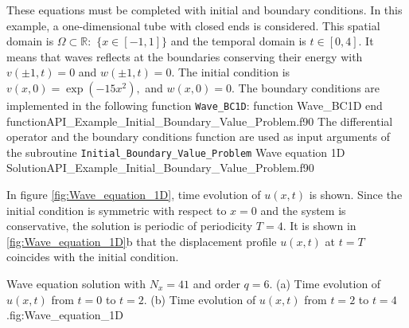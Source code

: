 These equations must be completed with initial and boundary conditions. In this example,  a one-dimensional tube
with closed ends is considered. This spatial domain is $\Omega \subset \mathbb{R} : $ $\{x\in  [-1,1]\}$ and the temporal domain is $t \in [0,4]$.  It means that waves reflects at the boundaries conserving their energy with $v( \pm 1, t) = 0$ and $ w( \pm 1, t) = 0$. 
The initial condition is $  v(x,0)  = \exp(-15 x^2),$ and  $  w(x,0)  = 0.$
The boundary conditions are implemented in the following function \verb|Wave_BC1D|:    
\vspace{0.5cm} 
     {function Wave_BC1D}
     {end function}{API_Example_Initial_Boundary_Value_Problem.f90}      
The differential operator and the boundary conditions function  are used as input arguments of the subroutine \verb|Initial_Boundary_Value_Problem|
\vspace{0.5cm} 
     {Wave equation 1D}
     {Solution}{API_Example_Initial_Boundary_Value_Problem.f90}
     
     
In figure \ref{fig:Wave_equation_1D}, time evolution of $ u(x,t) $ is shown. Since the initial condition is symmetric with respect to $ x=0$ and the system is conservative, the solution is periodic of periodicity $ T=4$. It is shown in \ref{fig:Wave_equation_1D}b that the displacement profile $ u(x,t) $ at $ t= T $ coincides with the initial condition.   
   
\twographs
{}
{}
{Wave equation solution with $N_x = 41$ and order $q=6$. (a) Time evolution of $u(x,t)$ from $t=0$ to $t=2$. 
(b) Time evolution of $u(x,t)$ from $t=2$ to $t=4$.}{fig:Wave_equation_1D}
    

      
\newpage 
